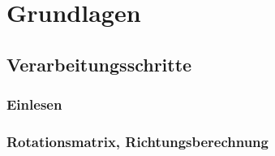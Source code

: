 \chapter{Grundlagen}
















\section{Verarbeitungsschritte}
\subsection{Einlesen}
\subsection{Rotationsmatrix, Richtungsberechnung}


